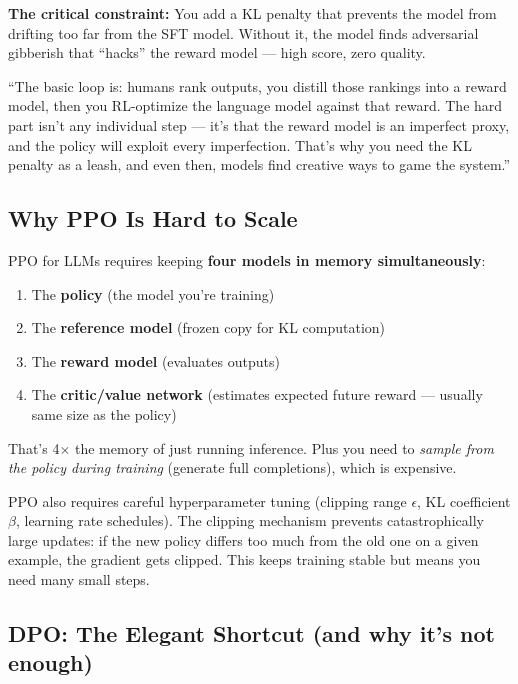 \textbf{The critical constraint:} You add a KL penalty that prevents the model from drifting too far from the SFT model. Without it, the model finds adversarial gibberish that ``hacks'' the reward model --- high score, zero quality.

\begin{sayit}
``The basic loop is: humans rank outputs, you distill those rankings into a reward model, then you RL-optimize the language model against that reward. The hard part isn't any individual step --- it's that the reward model is an imperfect proxy, and the policy will exploit every imperfection. That's why you need the KL penalty as a leash, and even then, models find creative ways to game the system.''
\end{sayit}

\subsection{Why PPO Is Hard to Scale}

PPO for LLMs requires keeping \textbf{four models in memory simultaneously}:
\begin{enumerate}
  \item The \textbf{policy} (the model you're training)
  \item The \textbf{reference model} (frozen copy for KL computation)
  \item The \textbf{reward model} (evaluates outputs)
  \item The \textbf{critic/value network} (estimates expected future reward --- usually same size as the policy)
\end{enumerate}

That's 4$\times$ the memory of just running inference. Plus you need to \textit{sample from the policy during training} (generate full completions), which is expensive.

\begin{deeper}
PPO also requires careful hyperparameter tuning (clipping range $\epsilon$, KL coefficient $\beta$, learning rate schedules). The clipping mechanism prevents catastrophically large updates: if the new policy differs too much from the old one on a given example, the gradient gets clipped. This keeps training stable but means you need many small steps.
\end{deeper}

\subsection{DPO: The Elegant Shortcut (and why it's not enough)}

